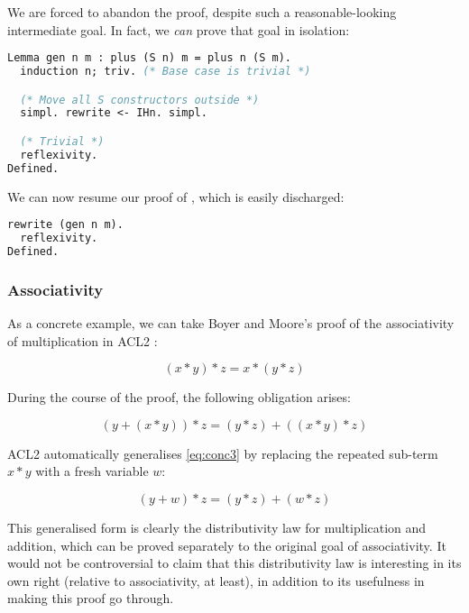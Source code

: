 \documentclass[]{article}
\begin{document}
We are forced to abandon the proof, despite such a reasonable-looking intermediate goal. In fact, we \emph{can} prove that goal in isolation:

\begin{lstlisting}[language=ML, xleftmargin=.2\textwidth, xrightmargin=.2\textwidth]
Lemma gen n m : plus (S n) m = plus n (S m).
  induction n; triv. (* Base case is trivial *)

  (* Move all S constructors outside *)
  simpl. rewrite <- IHn. simpl.

  (* Trivial *)
  reflexivity.
Defined.
\end{lstlisting}

We can now resume our proof of , which is easily discharged:

\begin{lstlisting}[language=ML, xleftmargin=.2\textwidth, xrightmargin=.2\textwidth]
  rewrite (gen n m).
  reflexivity.
Defined.
\end{lstlisting}

\subsubsection{Associativity}

As a concrete example, we can take Boyer and Moore's proof of the associativity of multiplication in ACL2 \cite{boyer1983proof}:

$$(x * y) * z = x * (y * z)$$

During the course of the proof, the following obligation arises:

\begin{equation}
  \tag{conc3}
  (y + (x * y)) * z = (y * z) + ((x * y) * z)
  \label{eq:conc3}
\end{equation}

ACL2 automatically generalises \eqref{eq:conc3} by replacing the repeated sub-term $x * y$ with a fresh variable $w$:

\begin{equation}
  \tag{conc4}
  (y + w) * z = (y * z) + (w * z)
  \label{eq:conc4}
\end{equation}

This generalised form is clearly the distributivity law for multiplication and addition, which can be proved separately to the original goal of associativity. It would not be controversial to claim that this distributivity law is interesting in its own right (relative to associativity, at least), in addition to its usefulness in making this proof go through.
\end{document}
